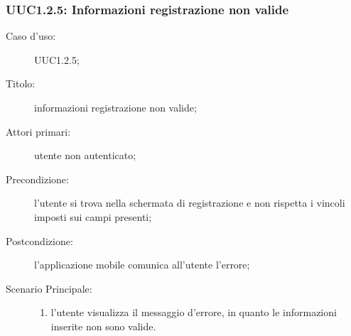 \documentclass[components/casi-duso-app]{subfiles}
\begin{document}
\subsubsection{UUC1.2.5: Informazioni registrazione non valide}%
\label{subs:UUC1.2.5}
\begin{description}
  \item[Caso d’uso:] UUC1.2.5;
  \item[Titolo:] informazioni registrazione non valide;
  \item[Attori primari:] utente non autenticato;
  \item[Precondizione:] l'utente si trova nella schermata di registrazione e non rispetta i vincoli imposti sui campi presenti;
  \item[Postcondizione:] l'applicazione mobile comunica all'utente l'errore;
  \item[Scenario Principale:]
        \begin{enumerate}
          \item l'utente visualizza il messaggio d'errore, in quanto le informazioni inserite non sono valide.
        \end{enumerate}
\end{description}
\end{document}
